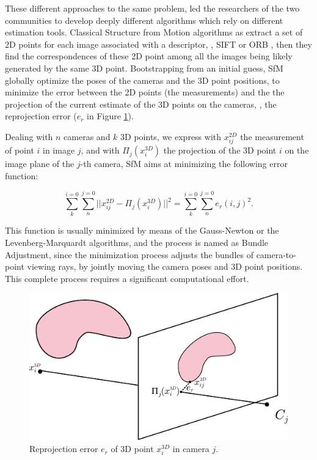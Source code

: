 These different approaches to the same problem, led the researchers of the two communities to develop deeply different algorithms which rely on different estimation tools.
Classical Structure from Motion algorithms as \cite{triggs2000bundle,sibley2009adaptive,wu2011multicore} extract a set of 2D points for each image associated with a descriptor, \eg, SIFT \cite{sift} or ORB \cite{orb},  then they find the correspondences of these 2D point among all the images being likely generated by the same 3D point. Bootstrapping from an initial guess, SfM globally optimize the poses of the cameras and the 3D point positions, to minimize the error between the 2D points (the measurements) and the the projection of the current estimate of the 3D points on the cameras, \ie, the reprojection error ($e_r$ in Figure \ref{fig:reprojectionerror}).

Dealing with $n$ cameras and $k$ 3D points, we express with $x_{ij}^{2D}$ the measurement of point $i$ in image $j$, and with $\Pi_j(x_i^{3D})$ the projection of the 3D point $i$ on the image plane of the $j$-th camera, SfM aims at minimizing the following error function:

\begin{equation}
\sum_{k}^{i=0}\sum_{n}^{j=0}||x_{ij}^{2D} - \Pi_j(x_i^{3D})||^2 = \sum_{k}^{i=0}\sum_{n}^{j=0}e_r(i,j) ^2.
\end{equation}

This function is usually minimized by means of the Gauss-Newton or the Levenberg-Marquardt algorithms, and the process is named as Bundle Adjustment, since the minimization process adjusts the bundles of camera-to-point viewing rays, by jointly moving the camera poses and 3D point positions. This complete process requires a significant computational effort.

\begin{figure}[t]
\includegraphics[width=0.99\columnwidth]{./img/ch_soa/reproj}
 \caption{Reprojection error $e_r$ of 3D point $x_i^{3D}$ in camera $j$.} 
    \label{fig:reprojectionerror}
\end{figure}



